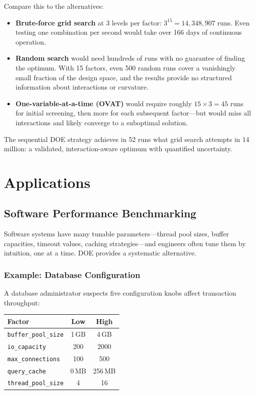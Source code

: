 \documentclass[11pt]{book}
\begin{document}
\noindent Compare this to the alternatives:

\begin{itemize}[nosep]
\item \textbf{Brute-force grid search} at 3 levels per factor:
      $3^{15} = 14{,}348{,}907$ runs. Even testing one combination per second
      would take over 166 days of continuous operation.
\item \textbf{Random search} would need hundreds of runs with no guarantee of
      finding the optimum. With 15 factors, even 500 random runs cover a
      vanishingly small fraction of the design space, and the results provide
      no structured information about interactions or curvature.
\item \textbf{One-variable-at-a-time (OVAT)} would require roughly
      $15 \times 3 = 45$ runs for initial screening, then more for each
      subsequent factor---but would miss all interactions and likely converge
      to a suboptimal solution.
\end{itemize}

\noindent The sequential DOE strategy achieves in 52 runs what grid search
attempts in 14 million: a validated, interaction-aware optimum with
quantified uncertainty.


\chapter{Applications}

\section{Software Performance Benchmarking}

Software systems have many tunable parameters---thread pool sizes, buffer
capacities, timeout values, caching strategies---and engineers often tune them
by intuition, one at a time. DOE provides a systematic alternative.

\subsection{Example: Database Configuration}

A database administrator suspects five configuration knobs affect transaction
throughput:

\begin{center}
\begin{tabular}{lcc}
\toprule
Factor & Low & High \\
\midrule
\texttt{buffer\_pool\_size} & 1\,GB & 4\,GB \\
\texttt{io\_capacity} & 200 & 2000 \\
\texttt{max\_connections} & 100 & 500 \\
\texttt{query\_cache} & 0\,MB & 256\,MB \\
\texttt{thread\_pool\_size} & 4 & 16 \\
\bottomrule
\end{tabular}
\end{center}
\end{document}
